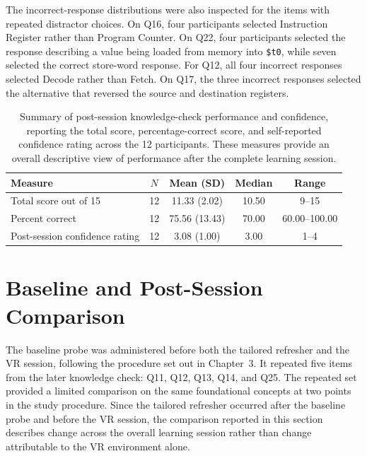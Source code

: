 The incorrect-response distributions were also inspected for the items with repeated distractor choices. On Q16, four participants selected Instruction Register rather than Program Counter. On Q22, four participants selected the response describing a value being loaded from memory into \texttt{\$t0}, while seven selected the correct store-word response. For Q12, all four incorrect responses selected Decode rather than Fetch. On Q17, the three incorrect responses selected the alternative that reversed the source and destination registers.



\begin{table}[!htbp]
\centering
\small
\renewcommand{\arraystretch}{1.1}
\begin{tabularx}{\textwidth}{>{\raggedright\arraybackslash}X c c c c}
\toprule
Measure & $N$ & Mean (SD) & Median & Range \\
\midrule
Total score out of 15 & 12 & 11.33 (2.02) & 10.50 & 9--15 \\
Percent correct & 12 & 75.56 (13.43) & 70.00 & 60.00--100.00 \\
Post-session confidence rating & 12 & 3.08 (1.00) & 3.00 & 1--4 \\
\bottomrule
\end{tabularx}
\caption[Post-session knowledge summary]{Summary of post-session knowledge-check performance and confidence, reporting the total score, percentage-correct score, and self-reported confidence rating across the 12 participants. These measures provide an overall descriptive view of performance after the complete learning session.}
\label{tab:post-knowledge-summary}
\end{table}

\section{Baseline and Post-Session Comparison}

The baseline probe was administered before both the tailored refresher and the VR session, following the procedure set out in Chapter~3. It repeated five items from the later knowledge check: Q11, Q12, Q13, Q14, and Q25. The repeated set provided a limited comparison on the same foundational concepts at two points in the study procedure. Since the tailored refresher occurred after the baseline probe and before the VR session, the comparison reported in this section describes change across the overall learning session rather than change attributable to the VR environment alone.

